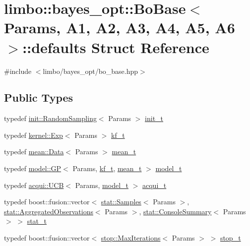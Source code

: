 \hypertarget{structlimbo_1_1bayes__opt_1_1_bo_base_1_1defaults}{}\section{limbo\+:\+:bayes\+\_\+opt\+:\+:Bo\+Base$<$ Params, A1, A2, A3, A4, A5, A6 $>$\+:\+:defaults Struct Reference}
\label{structlimbo_1_1bayes__opt_1_1_bo_base_1_1defaults}


{\ttfamily \#include $<$limbo/bayes\+\_\+opt/bo\+\_\+base.\+hpp$>$}

\subsection*{Public Types}
\begin{DoxyCompactItemize}
\item 
typedef \hyperlink{structlimbo_1_1init_1_1_random_sampling}{init\+::\+Random\+Sampling}$<$ Params $>$ \hyperlink{structlimbo_1_1bayes__opt_1_1_bo_base_1_1defaults_a675d927a474fc77608cc63c8406448f7}{init\+\_\+t}
\item 
typedef \hyperlink{structlimbo_1_1kernel_1_1_exp}{kernel\+::\+Exp}$<$ Params $>$ \hyperlink{structlimbo_1_1bayes__opt_1_1_bo_base_1_1defaults_a0a88a267bef731645079455cb11fa836}{kf\+\_\+t}
\item 
typedef \hyperlink{structlimbo_1_1mean_1_1_data}{mean\+::\+Data}$<$ Params $>$ \hyperlink{structlimbo_1_1bayes__opt_1_1_bo_base_1_1defaults_ae66c699015cb936c8c429c64154bf202}{mean\+\_\+t}
\item 
typedef \hyperlink{classlimbo_1_1model_1_1_g_p}{model\+::\+G\+P}$<$ Params, \hyperlink{structlimbo_1_1bayes__opt_1_1_bo_base_1_1defaults_a0a88a267bef731645079455cb11fa836}{kf\+\_\+t}, \hyperlink{structlimbo_1_1bayes__opt_1_1_bo_base_1_1defaults_ae66c699015cb936c8c429c64154bf202}{mean\+\_\+t} $>$ \hyperlink{structlimbo_1_1bayes__opt_1_1_bo_base_1_1defaults_a07f65b6332c4f0c029069100feecb789}{model\+\_\+t}
\item 
typedef \hyperlink{classlimbo_1_1acqui_1_1_u_c_b}{acqui\+::\+U\+C\+B}$<$ Params, \hyperlink{structlimbo_1_1bayes__opt_1_1_bo_base_1_1defaults_a07f65b6332c4f0c029069100feecb789}{model\+\_\+t} $>$ \hyperlink{structlimbo_1_1bayes__opt_1_1_bo_base_1_1defaults_a4cb9b80ab762b3b763fdd97e893886e5}{acqui\+\_\+t}
\item 
typedef boost\+::fusion\+::vector$<$ \hyperlink{structlimbo_1_1stat_1_1_samples}{stat\+::\+Samples}$<$ Params $>$, \hyperlink{structlimbo_1_1stat_1_1_aggregated_observations}{stat\+::\+Aggregated\+Observations}$<$ Params $>$, \hyperlink{structlimbo_1_1stat_1_1_console_summary}{stat\+::\+Console\+Summary}$<$ Params $>$ $>$ \hyperlink{structlimbo_1_1bayes__opt_1_1_bo_base_1_1defaults_ab8f3991474723d27b9c77d0e0a76fce2}{stat\+\_\+t}
\item 
typedef boost\+::fusion\+::vector$<$ \hyperlink{structlimbo_1_1stop_1_1_max_iterations}{stop\+::\+Max\+Iterations}$<$ Params $>$ $>$ \hyperlink{structlimbo_1_1bayes__opt_1_1_bo_base_1_1defaults_a66e1dbe1ccd9dbef0fdfc5c9faee9eff}{stop\+\_\+t}
\end{DoxyCompactItemize}
